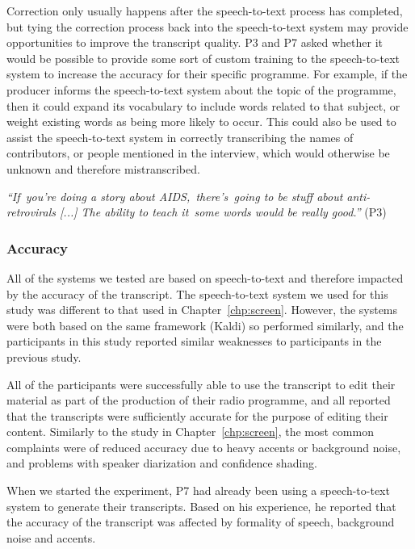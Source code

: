 Correction only usually happens after the speech-to-text process has completed, but tying the correction process back
into the speech-to-text system may provide opportunities to improve the transcript quality.  P3 and P7 asked whether it
would be possible to provide some sort of custom training to the speech-to-text system to increase the accuracy for
their specific programme. For example, if the producer informs the speech-to-text system about the topic of the
programme, then it could expand its vocabulary to include words related to that subject, or weight existing words as
being more likely to occur. This could also be used to assist the speech-to-text system in correctly transcribing the
names of contributors, or people mentioned in the interview, which would otherwise be unknown and therefore
mistranscribed.

\textit{``If you're doing a story about AIDS, there's going to be stuff about anti-retrovirals [...]
The ability to teach it some words would be really good.''} (P3)

\subsubsection{Accuracy}

All of the systems we tested are based on speech-to-text and therefore impacted by the accuracy of the transcript.  The
speech-to-text system we used for this study was different to that used in Chapter~\ref{chp:screen}.  However, the
systems were both based on the same framework (Kaldi) so performed similarly, and the participants in this study
reported similar weaknesses to participants in the previous study.

All of the participants were successfully able to use the transcript to edit their material as part of the production
of their radio programme, and all reported that the transcripts were sufficiently accurate for the purpose of editing
their content. Similarly to the study in Chapter~\ref{chp:screen}, the most common complaints were of reduced accuracy
due to heavy accents or background noise, and problems with speaker diarization and confidence shading.

When we started the experiment, P7 had already been using a speech-to-text system to generate their transcripts. Based
on his experience, he reported that the accuracy of the transcript was affected by formality of speech, background
noise and accents.


